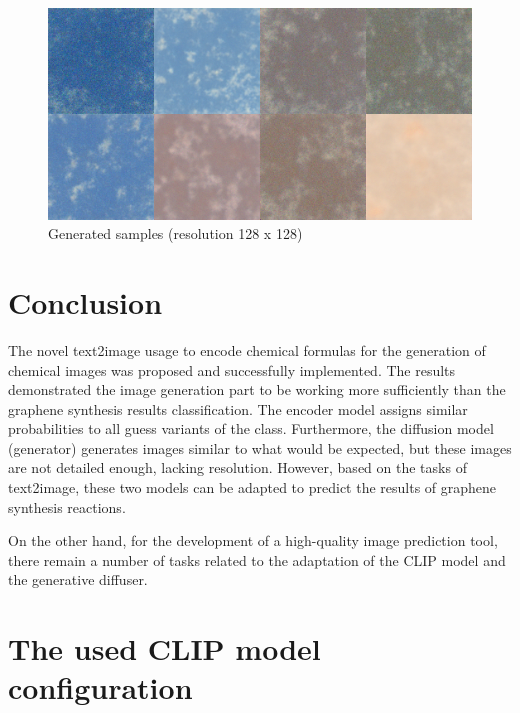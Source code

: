 \documentclass[runningheads]{llncs}
\begin{document}
\\
\begin{figure}[h]
    \centering
    \includegraphics[scale=0.65]{img/graphene-diffuser-inference.png}
    \caption{Generated samples (resolution 128 x 128)}
    \label{img:diffuser_inference_results}
\end{figure}

\section*{Conclusion} %

The novel text2image usage to encode chemical formulas for the generation of chemical images was proposed and successfully implemented. The results demonstrated the image generation part to be working more sufficiently than the graphene synthesis results classification. The encoder model assigns similar probabilities to all guess variants of the class. Furthermore, the diffusion model (generator) generates images similar to what would be expected, but these images are not detailed enough, lacking resolution. However, based on the tasks of text2image, these two models can be adapted to predict the results of graphene synthesis reactions.
\par
On the other hand, for the development of a high-quality image prediction tool, there remain a number of tasks related to the adaptation of the CLIP model and the generative diffuser.
%
%
%



\appendix

\section{The used CLIP model configuration}
\label{app:clip hyperparameters}
\end{document}
